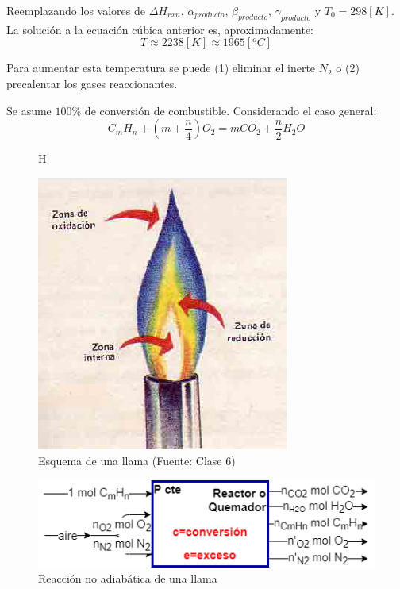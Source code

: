     \begin{multicols}{2}
        Reemplazando los valores de \(\Delta H_{rxn}\), \(\alpha_{producto}\), \(\beta_{producto}\), \(\gamma_{producto}\) y \(T_{0}=298[K]\). La solución a la ecuación cúbica anterior es, aproximadamente:
        \[T\approx2238[K]\approx1965[{}^{o}C]\]
        
        Para aumentar esta temperatura se puede (1) eliminar el inerte \(N_{2}\) o (2) precalentar los gases reaccionantes.
        
        Se asume \(100\%\) de conversión de combustible. Considerando el caso general:
        \[C_{m}H_{n}+\left ( m + \frac{n}{4} \right )O_{2}=mCO_{2}+\frac{n}{2}H_{2}O\]
        
        \begin{figure}{H}
            \caption{Esquema de una llama (Fuente: Clase 6)}
            \label{fig:llama}
            \includegraphics[width=.9\textwidth]{img/clases/llama.png}
        \end{figure}
    \end{multicols}
    
    \begin{figure}[H]
        \centering
        \includegraphics[width=.8\textwidth]{img/esquemas/llama_no_adiabatica.png}
        \caption{Reacción no adiabática de una llama}
        \label{fig:com_no_llama}
    \end{figure}
    
